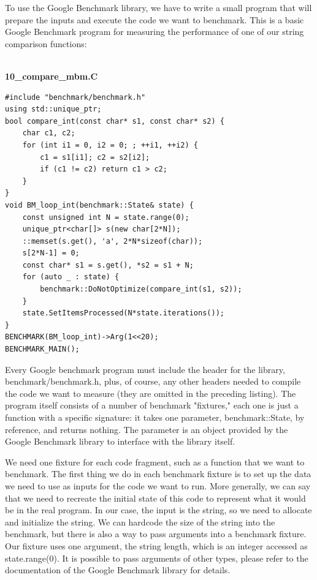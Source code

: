 To use the Google Benchmark library, we have to write a small program that will prepare the inputs and execute the code we want to benchmark. This is a basic Google Benchmark program for measuring the performance of one of our string comparison functions:

\hspace*{\fill} \\ %
\noindent
\textbf{10\_compare\_mbm.C}
\begin{lstlisting}[style=styleCXX]
#include "benchmark/benchmark.h"
using std::unique_ptr;
bool compare_int(const char* s1, const char* s2) {
	char c1, c2;
	for (int i1 = 0, i2 = 0; ; ++i1, ++i2) {
		c1 = s1[i1]; c2 = s2[i2];
		if (c1 != c2) return c1 > c2;
	}
}
void BM_loop_int(benchmark::State& state) {
	const unsigned int N = state.range(0);
	unique_ptr<char[]> s(new char[2*N]);
	::memset(s.get(), 'a', 2*N*sizeof(char));
	s[2*N-1] = 0;
	const char* s1 = s.get(), *s2 = s1 + N;
	for (auto _ : state) {
		benchmark::DoNotOptimize(compare_int(s1, s2));
	}
	state.SetItemsProcessed(N*state.iterations());
}
BENCHMARK(BM_loop_int)->Arg(1<<20);
BENCHMARK_MAIN();
\end{lstlisting}

Every Google benchmark program must include the header for the library, benchmark/benchmark.h, plus, of course, any other headers needed to compile the code we want to measure (they are omitted in the preceding listing). The program itself consists of a number of benchmark "fixtures," each one is just a function with a specific signature: it takes one parameter, benchmark::State, by reference, and returns nothing. The parameter is an object provided by the Google Benchmark library to interface with the library itself. 

We need one fixture for each code fragment, such as a function that we want to benchmark. The first thing we do in each benchmark fixture is to set up the data we need to use as inputs for the code we want to run. More generally, we can say that we need to recreate the initial state of this code to represent what it would be in the real program. In our case, the input is the string, so we need to allocate and initialize the string. We can hardcode the size of the string into the benchmark, but there is also a way to pass arguments into a benchmark fixture. Our fixture uses one argument, the string length, which is an integer accessed as state.range(0). It is possible to pass arguments of other types, please refer to the documentation of the Google Benchmark library for details.

